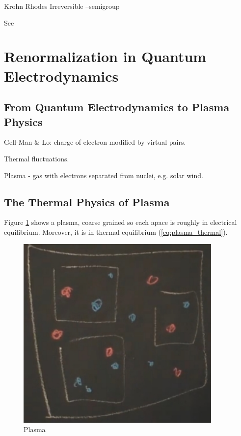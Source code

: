 \documentclass[]{article}
\begin{document}
Krohn Rhodes Irreversible --semigroup

See \cite{dedeo2011effective,maler2010krohn,rhodes2009applications}
\section{Renormalization in Quantum Electrodynamics}
\subsection{From Quantum Electrodynamics to Plasma Physics }

Gell-Man \& Lo: charge of electron modified by virtual pairs. 

Thermal fluctuations.

Plasma - gas with electrons separated from nuclei, e.g. solar wind.

\subsection{The Thermal Physics of Plasma}

Figure \ref{fig:plasma} shows a plasma, coarse grained so each apace is roughly in electrical equilibrium. Moreover, it is in thermal equilibrium (\ref{eq:plasma_thermal}).
\begin{figure}[H]
	\caption{Plasma}\label{fig:plasma}
	\includegraphics[width=0.9\textwidth]{plasma}
\end{figure}
\end{document}
